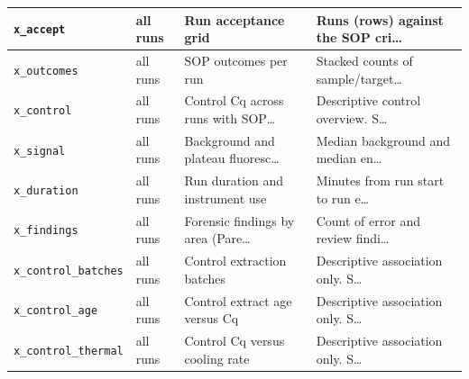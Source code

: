 {\begin{longtable}{@{}llll@{}}
\texttt{x\_accept} & all runs & Run acceptance grid & Runs (rows) against the SOP cri… \\\hline
\texttt{x\_outcomes} & all runs & SOP outcomes per run & Stacked counts of sample/target… \\\hline
\texttt{x\_control} & all runs & Control Cq across runs with SOP… & Descriptive control overview. S… \\\hline
\texttt{x\_signal} & all runs & Background and plateau fluoresc… & Median background and median en… \\\hline
\texttt{x\_duration} & all runs & Run duration and instrument use & Minutes from run start to run e… \\\hline
\texttt{x\_findings} & all runs & Forensic findings by area (Pare… & Count of error and review findi… \\\hline
\texttt{x\_control\_batches} & all runs & Control extraction batches & Descriptive association only. S… \\\hline
\texttt{x\_control\_age} & all runs & Control extract age versus Cq & Descriptive association only. S… \\\hline
\texttt{x\_control\_thermal} & all runs & Control Cq versus cooling rate & Descriptive association only. S… \\\hline
\bottomrule
\end{longtable}}

